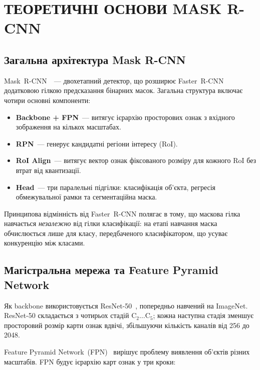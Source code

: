 \documentclass[14pt,a4paper]{extreport}
\begin{document}
\chapter{ТЕОРЕТИЧНІ ОСНОВИ MASK R-CNN}

\section{Загальна архітектура Mask R-CNN}

Mask~R-CNN~\cite{maskrcnn2017}~--- двохетапний детектор, що розширює
Faster~R-CNN~\cite{fasterrcnn2017} додатковою гілкою предсказання
бінарних масок. Загальна структура включає чотири основні компоненти:

\begin{itemize}
  \item \textbf{Backbone + FPN}~--- витягує ієрархію просторових ознак з
        вхідного зображення на кількох масштабах.
  \item \textbf{RPN}~--- генерує кандидатні регіони інтересу (RoI).
  \item \textbf{RoI Align}~--- витягує вектор ознак фіксованого розміру
        для кожного RoI без втрат від квантизації.
  \item \textbf{Head}~--- три паралельні підгілки: класифікація об'єкта,
        регресія обмежувальної рамки та сегментаційна маска.
\end{itemize}

Принципова відмінність від Faster~R-CNN полягає в тому, що маскова гілка
навчається \emph{незалежно} від гілки класифікації: на етапі навчання
маска обчислюється лише для класу, передбаченого класифікатором, що
усуває конкуренцію між класами.

\section{Магістральна мережа та Feature Pyramid Network}

Як backbone використовується ResNet-50~\cite{resnet2016}, попередньо
навчений на ImageNet. ResNet-50 складається з чотирьох стадій
$\mathrm{C}_2\ldots\mathrm{C}_5$; кожна наступна стадія зменшує
просторовий розмір карти ознак вдвічі, збільшуючи кількість каналів від
256 до 2048.

Feature Pyramid Network~(FPN)~\cite{fpn2017} вирішує проблему виявлення
об'єктів різних масштабів. FPN будує ієрархію карт ознак у три кроки:
\end{document}
